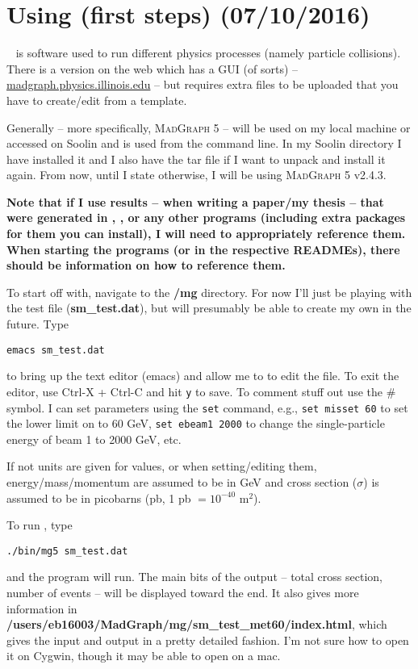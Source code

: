 
\chapter{Using \madgraph (first steps) (07/10/2016)}

\madgraph~\cite{Alwall:2011madgraph} is software used to run different physics processes (namely particle collisions). There is a version on the web which has a GUI (of sorts) -- \url{madgraph.physics.illinois.edu} -- but requires extra files to be uploaded that you have to create/edit from a template.

Generally \madgraph -- more specifically, \textsc{MadGraph 5} -- will be used on my local machine or accessed on Soolin and is used from the command line. In my Soolin directory I have installed it and I also have the tar file if I want to unpack and install it again. From now, until I state otherwise, I will be using \textsc{MadGraph 5} v2.4.3.

\textbf{Note that if I use results -- when writing a paper/my thesis -- that were generated in \madgraph, \madanalysis, \ROOT or any other programs (including extra packages for them you can install), I will need to appropriately reference them. When starting the programs (or in the respective READMEs), there should be information on how to reference them.}

To start off with, navigate to the \textbf{/mg} directory. For now I'll just be playing with the test file (\textbf{sm\_test.dat}), but will presumably be able to create my own in the future. Type

\texttt{emacs sm\_test.dat}

to bring up the text editor (emacs) and allow me to to edit the file. To exit the editor, use Ctrl-X + Ctrl-C and hit \texttt{y} to save. To comment stuff out use the \# symbol. I can set parameters using the \texttt{set} command, e.g., \texttt{set misset 60} to set the lower limit on \etmiss to 60 GeV, \texttt{set ebeam1 2000} to change the single-particle energy of beam 1 to 2000 GeV, etc.

If not units are given for values, or when setting/editing them, energy/mass/momentum are assumed to be in GeV and cross section ($\sigma$) is assumed to be in picobarns (pb, 1 pb $= 10^{-40}$ m$^2$).

To run \madgraph, type

\texttt{./bin/mg5 sm\_test.dat}

and the program will run. The main bits of the output -- total cross section, number of events -- will be displayed toward the end. It also gives more information in \textbf{/users/eb16003/MadGraph/mg/sm\_test\_met60/index.html}, which gives the input and output in a pretty detailed fashion. I'm not sure how to open it on Cygwin, though it may be able to open on a mac.

